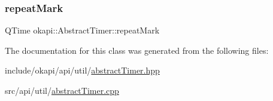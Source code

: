 \subsubsection{\texorpdfstring{repeatMark}{repeatMark}}
{\footnotesize\ttfamily Q\+Time okapi\+::\+Abstract\+Timer\+::repeat\+Mark\hspace{0.3cm}{\ttfamily [protected]}}



The documentation for this class was generated from the following files\+:\begin{DoxyCompactItemize}
\item 
include/okapi/api/util/\mbox{\hyperlink{abstractTimer_8hpp}{abstract\+Timer.\+hpp}}\item 
src/api/util/\mbox{\hyperlink{abstractTimer_8cpp}{abstract\+Timer.\+cpp}}\end{DoxyCompactItemize}
